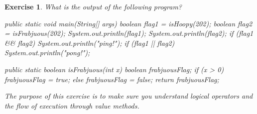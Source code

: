 \documentclass[12pt]{book}
\theoremstyle{exercise}
\newtheorem{exercise}{Exercise}[chapter]
\begin{document}
\begin{exercise}

What is the output of the following program?

\begin{code}
public static void main(String[] args) {
    boolean flag1 = isHoopy(202);
    boolean flag2 = isFrabjuous(202);
    System.out.println(flag1);
    System.out.println(flag2);
    if (flag1 && flag2) {
        System.out.println("ping!");
    }
    if (flag1 || flag2) {
        System.out.println("pong!");
    }
}
\end{code}


\begin{code}
public static boolean isFrabjuous(int x) {
    boolean frabjuousFlag;
    if (x > 0) {
        frabjuousFlag = true;
    } else {
        frabjuousFlag = false;
    }
    return frabjuousFlag;
}
\end{code}

The purpose of this exercise is to make sure you understand logical operators and the flow of execution through value methods.

\end{exercise}
\end{document}
